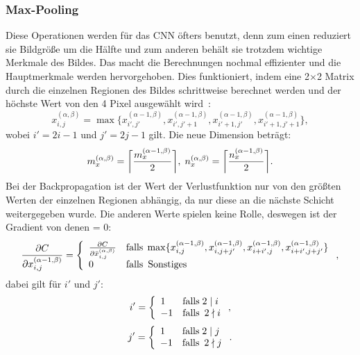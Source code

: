 \documentclass[11pt]{article}
\begin{document}
\subsubsection{Max-Pooling}
Diese Operationen werden für das CNN öfters benutzt, denn zum einen reduziert sie Bildgröße um die Hälfte und zum anderen behält sie trotzdem wichtige
Merkmale des Bildes. Das macht die Berechnungen nochmal effizienter und die Hauptmerkmale werden hervorgehoben. Dies funktioniert, indem eine 2$\times$2 Matrix
durch die einzelnen Regionen des Bildes schrittweise berechnet werden und der höchste Wert von den 4 Pixel ausgewählt wird~\cite{17}:
\begin{equation}
    x_{i,j}^{(\alpha,\beta)} = \max\{x_{i',j'}^{(\alpha-1,\beta)},x_{i',j'+1}^{(\alpha-1,\beta)},x_{i'+1,j'}^{(\alpha-1,\beta)},x_{i'+1,j'+1}^{(\alpha-1,\beta)}\},
\end{equation}
wobei $i' = 2i-1$ und $j' = 2j-1$ gilt. Die neue Dimension beträgt:
\begin{equation}
    m_{x}^{(\alpha,\beta)} = \bigg\lceil \frac{m_{x}^{(\alpha-1,\beta)}}{2} \bigg\rceil, \mkern5mu
    n_{x}^{(\alpha,\beta)} = \bigg\lceil \frac{n_{x}^{(\alpha-1,\beta)}}{2} \bigg\rceil.
\end{equation}
Bei der Backpropagation ist der Wert der Verlustfunktion nur von den größten Werten der einzelnen Regionen abhängig, da nur diese an die nächste Schicht weitergegeben wurde.
Die anderen Werte spielen keine Rolle, deswegen ist der Gradient von denen = 0:
\begin{equation}
    \frac{\partial C}{\partial x_{i,j}^{(\alpha-1,\beta)}} =
    \left\{
    \begin{array}{ll}
		\frac{\partial C}{\partial \bar{x}_{i,j}^{(\alpha,\beta)}} & \mathrm{falls} \mkern5mu \max\{x_{i,j}^{(\alpha-1,\beta)},x_{i,j+j'}^{(\alpha-1,\beta)},x_{i+i',j}^{(\alpha-1,\beta)},x_{i+i',j+j'}^{(\alpha-1,\beta)}\} \\
		0 & \mathrm{falls} \mkern9mu \mathrm{Sonstiges}
	\end{array}
    \right.,
\end{equation}
dabei gilt für $i'$ und $j'$:
\begin{equation}
i' =
    \left\{
    \begin{array}{ll}
		1 & \mathrm{falls} \mkern5mu 2 \mid i\\
		-1 & \mathrm{falls} \mkern9mu 2 \nmid i
	\end{array}
    \right.,
\end{equation}
\begin{equation}
    j' =
        \left\{
        \begin{array}{ll}
            1 & \mathrm{falls} \mkern5mu 2 \mid j\\
            -1 & \mathrm{falls} \mkern9mu 2 \nmid j
        \end{array}
        \right..
    \end{equation}
\end{document}
